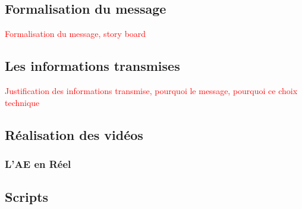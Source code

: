 
\subsection{Formalisation du message}

\textcolor{red}{Formalisation du message, story board}



\subsection{Les informations transmises}

\textcolor{red}{Justification des informations transmise, pourquoi le message, pourquoi ce choix technique}


\subsection{Réalisation des vidéos}





\subsubsection{L'AE en Réel}

\subsection{Scripts}\label{subsec:scripts}

\begin{dialogue}
     \lipsum[1]
     \lipsum[2]
\end{dialogue}